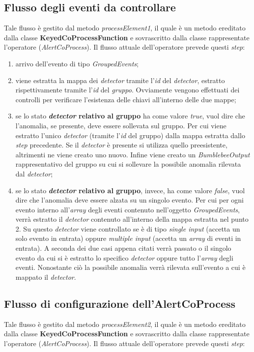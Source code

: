 \subsection{Flusso degli eventi da controllare}\label{sec:pr1-alertcoprocess}
Tale flusso è gestito dal metodo \textit{processElement1}, il quale è un metodo ereditato dalla classe \textbf{KeyedCoProcessFunction} e sovrascritto dalla classe rappresentate l'operatore (\textit{AlertCoProcess}). Il flusso attuale dell'operatore prevede questi \textit{step}:
\begin{enumerate}
	\item{arrivo dell'evento di tipo \textit{GroupedEvents};}
	\item{viene estratta la mappa dei \textit{detector} tramite l'\textit{id} del \textit{detector}, estratto rispettivamente tramite l'\textit{id} del \textit{gruppo}. Ovviamente vengono effettuati dei controlli per verificare l'esistenza delle chiavi all'interno delle due mappe;}
	\item{se lo stato \textbf{\textit{detector} relativo al gruppo} ha come valore \textit{true}, vuol dire che l'anomalia, se presente, deve essere sollevata sul gruppo. Per cui viene estratto l'unico \textit{detector} (tramite l'\textit{id} del gruppo) dalla mappa estratta dallo \textit{step} precedente. Se il \textit{detector} è presente si utilizza quello preesistente, altrimenti ne viene creato uno nuovo. Infine viene creato un \textit{BumblebeeOutput} rappresentativo del gruppo su cui si sollevare la possibile anomalia rilevata dal \textit{detector};}
	\item{se lo stato \textbf{\textit{detector} relativo al gruppo}, invece, ha come valore \textit{false}, vuol dire che l'anomalia deve essere alzata su un singolo evento. Per cui per ogni evento interno all'\textit{array} degli eventi contenuto nell'oggetto \textit{GroupedEvents}, verrà estratto il \textit{detector} contenuto all'interno della mappa estratta nel punto 2. Su questo \textit{detector} viene controllato se è di tipo \textit{single input} (accetta un solo evento in entrata) oppure \textit{multiple input} (accetta un \textit{array} di eventi in entrata). A seconda dei due casi appena citati verrà passato o il singolo evento da cui si è estratto lo specifico \textit{detector} oppure tutto l'\textit{array} degli eventi. Nonostante ciò la possibile anomalia verrà rilevata sull'evento a cui è mappato il \textit{detector}.}
\end{enumerate}

\subsection{Flusso di configurazione dell'AlertCoProcess}\label{sec:pr2-alertcoprocess}
Tale flusso è gestito dal metodo \textit{processElement2}, il quale è un metodo ereditato dalla classe \textbf{KeyedCoProcessFunction} e sovrascritto dalla classe rappresentate l'operatore (\textit{AlertCoProcess}). Il flusso attuale dell'operatore prevede questi \textit{step}:

